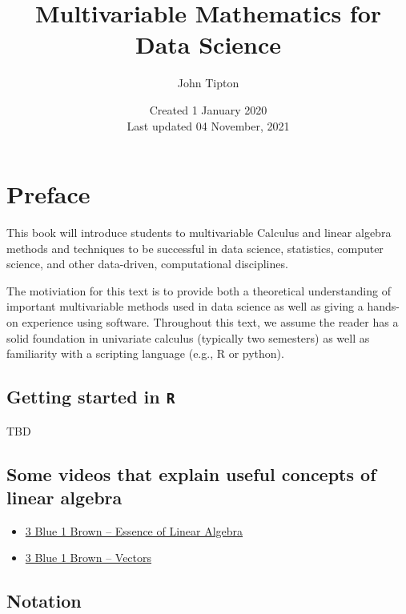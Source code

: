 \documentclass[
]{book}
\title{Multivariable Mathematics for Data Science}
\author{John Tipton}
\date{Created 1 January 2020\\
Last updated 04 November, 2021}
\theoremstyle{definition}
\theoremstyle{definition}
\theoremstyle{definition}
\theoremstyle{remark}
\begin{document}
\maketitle

{
\setcounter{tocdepth}{1}
\tableofcontents
}
\hypertarget{preface}{%
\chapter{Preface}\label{preface}}

This book will introduce students to multivariable Calculus and linear algebra methods and techniques to be successful in data science, statistics, computer science, and other data-driven, computational disciplines.

The motiviation for this text is to provide both a theoretical understanding of important multivariable methods used in data science as well as giving a hands-on experience using software. Throughout this text, we assume the reader has a solid foundation in univariate calculus (typically two semesters) as well as familiarity with a scripting language (e.g., R or python).

\hypertarget{getting-started-in-r}{%
\section{\texorpdfstring{Getting started in \texttt{R}}{Getting started in R}}\label{getting-started-in-r}}

TBD

\hypertarget{some-videos-that-explain-useful-concepts-of-linear-algebra}{%
\section{Some videos that explain useful concepts of linear algebra}\label{some-videos-that-explain-useful-concepts-of-linear-algebra}}

\begin{itemize}
\item
  \href{https://www.3blue1brown.com/lessons/eola-preview}{3 Blue 1 Brown -- Essence of Linear Algebra}
\item
  \href{https://www.3blue1brown.com/lessons/vectors}{3 Blue 1 Brown -- Vectors}
\end{itemize}

\hypertarget{notation}{%
\section{Notation}\label{notation}}
\end{document}
